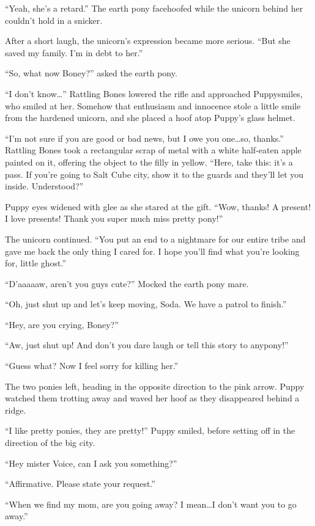 ``Yeah, she's a retard.'' The earth pony facehoofed while the unicorn behind her couldn't hold in a snicker.

After a short laugh, the unicorn's expression became more serious. ``But she saved my family. I'm in debt to her.''

``So, what now Boney?'' asked the earth pony.

``I don't know\dots'' Rattling Bones lowered the rifle and approached Puppysmiles, who smiled at her. Somehow that enthusiasm and innocence stole a little smile from the hardened unicorn, and she placed a hoof atop Puppy's glass helmet.

``I'm not sure if you are good or bad news, but I owe you one\dots so, thanks.'' Rattling Bones took a rectangular scrap of metal with a white half-eaten apple painted on it, offering the object to the filly in yellow. ``Here, take this: it's a pass. If you're going to Salt Cube city, show it to the guards and they'll let you inside. Understood?''

Puppy eyes widened with glee as she stared at the gift. ``Wow, thanks! A present! I love presents! Thank you super much miss pretty pony!''

The unicorn continued. ``You put an end to a nightmare for our entire tribe and gave me back the only thing I cared for. I hope you'll find what you're looking for, little ghost.''

``D'aaaaaw, aren't you guys cute?'' Mocked the earth pony mare.

``Oh, just shut up and let's keep moving, Soda. We have a patrol to finish.''

``Hey, are you crying, Boney?''

``Aw, just shut up! And don't you dare laugh or tell this story to anypony!''

``Guess what? Now I feel sorry for killing her.''

The two ponies left, heading in the opposite direction to the pink arrow. Puppy watched them trotting away and waved her hoof as they disappeared behind a ridge.

``I like pretty ponies, they are pretty!'' Puppy smiled, before setting off in the direction of the big city.

``Hey mister Voice, can I ask you something?''

``{\mt Affirmative. Please state your request.}''

``When we find my mom, are you going away? I mean\dots I don't want you to go away.''

